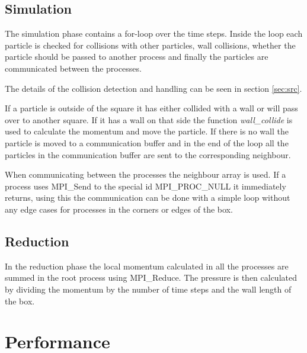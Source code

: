 \documentclass[a4paper, 12pt]{article}
\begin{document}
\subsection{Simulation}
The simulation phase contains a for-loop over the time steps. Inside the loop
each particle is checked for collisions with other particles, wall collisions,
whether the particle should be passed to another process and finally the
particles are communicated between the processes.

The details of the collision detection and handling can be seen in section
\ref{sec:src}.

If a particle is outside of the square it has either collided with a wall or
will pass over to another square. If it has a wall on that side the function
\textit{wall\_collide} is used to calculate the momentum and move the particle.
If there is no wall the particle is moved to a communication buffer and in the
end of the loop all the particles in the communication buffer are sent to the
corresponding neighbour.

When communicating between the processes the neighbour array is used. If a
process uses MPI\_Send to the special id MPI\_PROC\_NULL it immediately returns,
using this the communication can be done with a simple loop without any edge cases
for processes in the corners or edges of the box.

\subsection{Reduction}
In the reduction phase the local momentum calculated in all the processes are
summed in the root process using MPI\_Reduce. The pressure is then calculated
by dividing the momentum by the number of time steps and the wall length of the
box.

\section{Performance}
\end{document}
